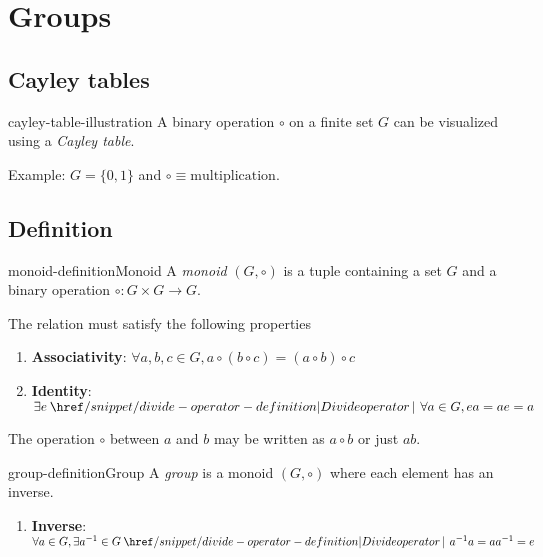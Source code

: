 \documentclass[preview]{standalone}
\begin{document}
\genpage

\section{Groups}

\subsection{Cayley tables}

\begin{snippet}{cayley-table-illustration}
A binary operation \(\circ\) on a finite set \(G\) can be
visualized using a \textit{Cayley table}.

Example: \(G=\{0,1\}\) and \(\circ \equiv \text{multiplication}\).
\\
\phantom{ }
\end{snippet}

\subsection{Definition}

\begin{snippetdefinition}{monoid-definition}{Monoid}
    A \textit{monoid} \((G,\circ)\) is a tuple containing a set \(G\) and
    a binary operation \(\circ \colon G \times G \to G\).
    
    The relation must satisfy the following properties
    
    \begin{enumerate}
        \item \textbf{Associativity}: \(\forall a,b,c\in G, a \circ (b \circ c) = (a \circ b) \circ c\)
        \item \textbf{Identity}: \(\exists e \divides \forall a \in G, ea=ae=a\) 
    \end{enumerate}
    
    The operation \(\circ\) between \(a\) and \(b\) may be written as
    \(a\circ b\) or just \(ab\).
\end{snippetdefinition}

\begin{snippetdefinition}{group-definition}{Group}
    A \textit{group} is a monoid \((G,\circ)\) where each element has an inverse.
    
    \begin{enumerate}
        \item \textbf{Inverse}: \(\forall a \in G, \exists a^{-1} \in G \divides a^{-1}a = aa^{-1} = e\)
    \end{enumerate}
\end{snippetdefinition}
\end{document}
